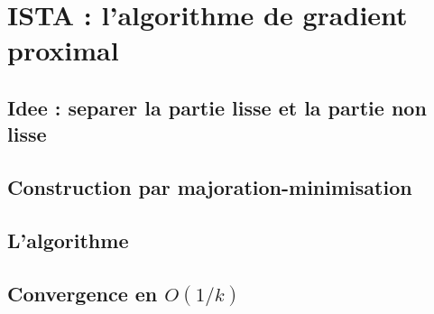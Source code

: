 %
%
%
\section{ISTA : l'algorithme de gradient proximal}
\label{sec:ista}


\subsection{Idee : separer la partie lisse et la partie non lisse}

\subsection{Construction par majoration-minimisation}

\subsection{L'algorithme}

\subsection{Convergence en $O(1/k)$}
